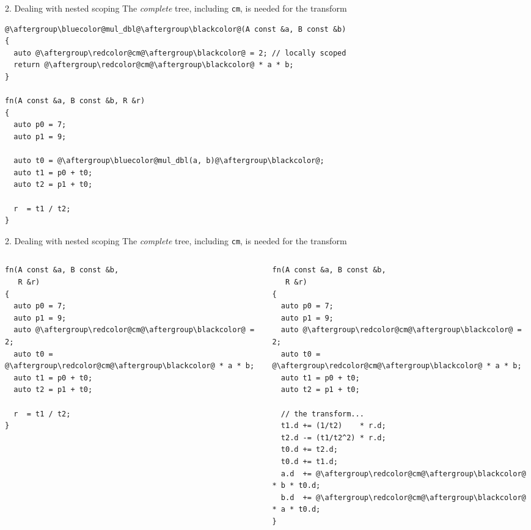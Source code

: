 \documentclass[xcolor=dvipsnames]{beamer}
\begin{document}
\begin{frame}[fragile]{2. Dealing with nested scoping}
The \emph{complete} tree, including {\color{red}\texttt{cm}}, is needed for the transform

      \begin{lstlisting}
@\aftergroup\bluecolor@mul_dbl@\aftergroup\blackcolor@(A const &a, B const &b)
{
  auto @\aftergroup\redcolor@cm@\aftergroup\blackcolor@ = 2; // locally scoped
  return @\aftergroup\redcolor@cm@\aftergroup\blackcolor@ * a * b;
}

fn(A const &a, B const &b, R &r)
{
  auto p0 = 7;
  auto p1 = 9;

  auto t0 = @\aftergroup\bluecolor@mul_dbl(a, b)@\aftergroup\blackcolor@;
  auto t1 = p0 + t0;
  auto t2 = p1 + t0;

  r  = t1 / t2;
}
  \end{lstlisting}
\end{frame}


\begin{frame}[fragile]{2. Dealing with nested scoping}
The \emph{complete} tree, including {\color{red}\texttt{cm}}, is needed for the transform
  \begin{columns}[T] %
    \begin{column}{0.44\textwidth}
      \begin{lstlisting}
fn(A const &a, B const &b,
   R &r)
{
  auto p0 = 7;
  auto p1 = 9;
  auto @\aftergroup\redcolor@cm@\aftergroup\blackcolor@ = 2;
  auto t0 = @\aftergroup\redcolor@cm@\aftergroup\blackcolor@ * a * b;
  auto t1 = p0 + t0;
  auto t2 = p1 + t0;

  r  = t1 / t2;
}
  \end{lstlisting}
    \end{column}%
    \hfill%
    \begin{column}{0.56\textwidth}
        \begin{lstlisting}
fn(A const &a, B const &b,
   R &r)
{
  auto p0 = 7;
  auto p1 = 9;
  auto @\aftergroup\redcolor@cm@\aftergroup\blackcolor@ = 2;
  auto t0 = @\aftergroup\redcolor@cm@\aftergroup\blackcolor@ * a * b;
  auto t1 = p0 + t0;
  auto t2 = p1 + t0;

  // the transform...
  t1.d += (1/t2)    * r.d;
  t2.d -= (t1/t2^2) * r.d;
  t0.d += t2.d;
  t0.d += t1.d;
  a.d  += @\aftergroup\redcolor@cm@\aftergroup\blackcolor@ * b * t0.d;
  b.d  += @\aftergroup\redcolor@cm@\aftergroup\blackcolor@ * a * t0.d;
}
  \end{lstlisting}
    \end{column}%
  \end{columns}
\end{frame}
\end{document}
